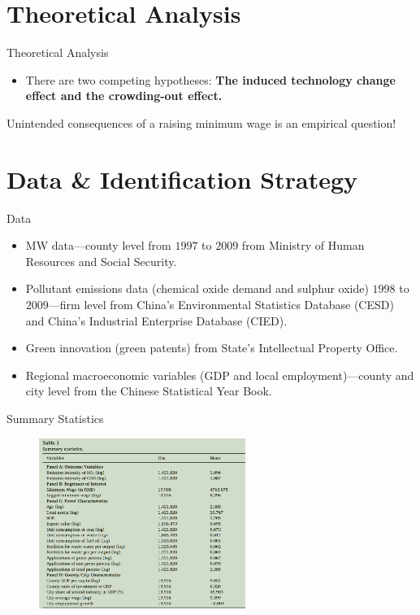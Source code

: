 \documentclass[aspectratio = 169]{beamer}
\begin{document}
    \section{Theoretical Analysis}\label{sec:theoretical-analysis}
    \begin{frame}{Theoretical Analysis}
        \begin{itemize}
            \item There are two competing hypotheses: \textbf{The induced technology change effect and the crowding-out effect.}
        \end{itemize}

        Unintended consequences of a raising minimum wage is an empirical question!

    \end{frame}


    \section{Data \& Identification Strategy}\label{sec:data-and-identification}
    \begin{frame}{Data}
        \begin{itemize}
            \item MW data---county level from $1997$ to $2009$ from Ministry of Human Resources and Social Security.
            \item Pollutant emissions data (chemical oxide demand and sulphur oxide) $1998$ to $2009$---firm level from China's Environmental Statistics Database (CESD) and China's Industrial Enterprise Database (CIED).
            \item Green innovation (green patents) from State's Intellectual Property Office.
            \item Regional macroeconomic variables (GDP and local employment)---county and city level from the Chinese Statistical Year Book.
        \end{itemize}
    \end{frame}

    \begin{frame}{Summary Statistics}
            \begin{figure}
                \centering
                \includegraphics[width = 0.6\textwidth, height = 0.8\textheight]{climate_change/beamer/sumstat}
                \label{fig:sumstat}
            \end{figure}
    \end{frame}
\end{document}
